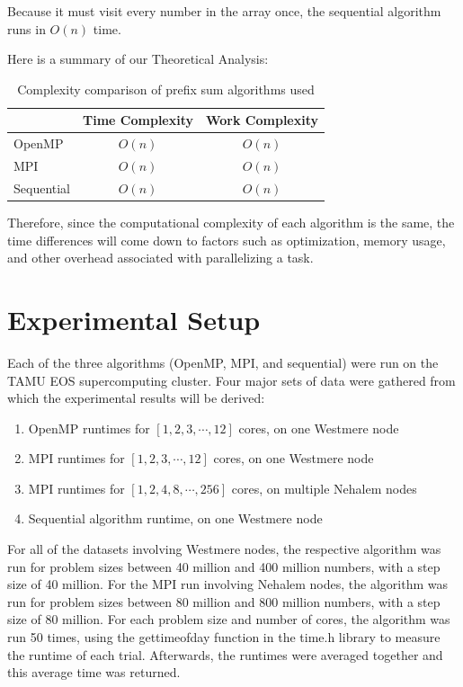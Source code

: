 \documentclass{article}
\begin{document}
Because it must visit every number in the array once, the sequential algorithm runs in $O(n)$ time.

Here is a summary of our Theoretical Analysis:

\begin{table}%
\centering
\begin{tabular}{|l|c|c|}

\multicolumn{1}{l|}{} & Time Complexity & Work Complexity \\
\hline
OpenMP							& $O(n)$ 					& $O(n)$ \\
\hline
MPI    							& $O(n)$ 					& $O(n)$ \\
\hline
Sequential       		& $O(n)$ 					& $O(n)$ \\
\hline

\end{tabular}
\caption{Complexity comparison of prefix sum algorithms used}
\label{}
\end{table}

Therefore, since the computational complexity of each algorithm is the same, the time differences will come down to factors such as optimization, memory usage, and other overhead associated with parallelizing a task.

\section{Experimental Setup}

Each of the three algorithms (OpenMP, MPI, and sequential) were run on the TAMU EOS supercomputing cluster.  Four major sets of data were gathered from which the experimental results will be derived:
\begin{enumerate}
	\item OpenMP runtimes for $[1,2,3,\cdots,12]$ cores, on one Westmere node
	\item MPI runtimes for $[1,2,3,\cdots,12]$ cores, on one Westmere node
	\item MPI runtimes for $[1,2,4,8,\cdots,256]$ cores, on multiple Nehalem nodes
	\item Sequential algorithm runtime, on one Westmere node
\end{enumerate}

For all of the datasets involving Westmere nodes, the respective algorithm was run for problem sizes between 40 million and 400 million numbers, with a step size of 40 million.  For the MPI run involving Nehalem nodes, the algorithm was run for problem sizes between 80 million and 800 million numbers, with a step size of 80 million.  For each problem size and number of cores, the algorithm was run 50 times, using the gettimeofday function in the time.h library to measure the runtime of each trial.  Afterwards, the runtimes were averaged together and this average time was returned.
\end{document}
